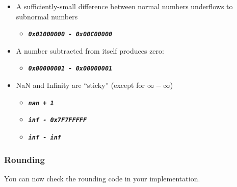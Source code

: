 \begin{itemize}
    \item A sufficiently-small difference between normal numbers underflows to subnormal numbers
    \begin{itemize}
        \item[] \texttt{\textbf{\textit{0x01000000 - 0x00C00000}}}
    \end{itemize}
    \item A number subtracted from itself produces zero:
    \begin{itemize}
        \item[] \texttt{\textbf{\textit{0x00000001 - 0x00000001}}}
    \end{itemize}
    \item NaN and Infinity are ``sticky'' (except for $\infty - \infty$)
    \begin{itemize}
        \item[] \texttt{\textbf{\textit{nan + 1}}}
        \item[] \texttt{\textbf{\textit{inf - 0x7F7FFFFF}}}
        \item[] \texttt{\textbf{\textit{inf - inf}}}
    \end{itemize}
\end{itemize}


\subsubsection*{Rounding}

You can now check the rounding code in your  implementation.

